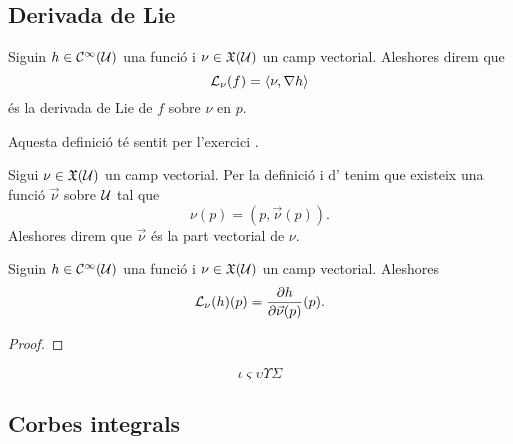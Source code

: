 \documentclass[../../Main.tex]{subfiles}
\begin{document}
	\subsection{Derivada de Lie}
	\begin{definition}
		\label{def:derivada de Lie}
		Siguin \(h\in\mathcal{C}^{\infty}(\mathcal{U})\) una funció i \(\nu\in\mathfrak{X}(\mathcal{U})\) un camp vectorial. Aleshores direm que
		\[
		    \Lie_{\nu}(f)=\prodesc{\nu}{\nabla h}
		\]
		 és la derivada de Lie de \(f\) sobre \(\nu\) en \(p\).
		 
		 Aquesta definició té sentit per l'exercici .
	\end{definition}
	\begin{definition}
		\label{def:part vectorial d'un camp vectorial}
		Sigui \(\nu\in\mathfrak{X}(\mathcal{U})\) un camp vectorial. Per la definició  i d' tenim que existeix una funció \(\vec{\nu}\) sobre \(\mathcal{U}\) tal que
		\[
		    \nu(p)=(p,\vec{\nu}(p)).
		\]
		Aleshores direm que \(\vec{\nu}\) és la part vectorial de \(\nu\).
	\end{definition}
	\begin{lemma}
		\label{lemma:la derivada de Lie és la derivada direccional}
		Siguin \(h\in\mathcal{C}^{\infty}(\mathcal{U})\) una funció i \(\nu\in\mathfrak{X}(\mathcal{U})\) un camp vectorial.
		Aleshores
		\[
		    \mathcal{L}_{\nu}(h)(p)=\frac{\partial h}{\partial\vec{\nu}(p)}(p).
		\]
		\begin{proof}
		\end{proof}
		\[
		    \iota\varsigma\upsilon\varUpsilon\varSigma
		\]
	\end{lemma}
	\subsection{Corbes integrals}
\end{document}
